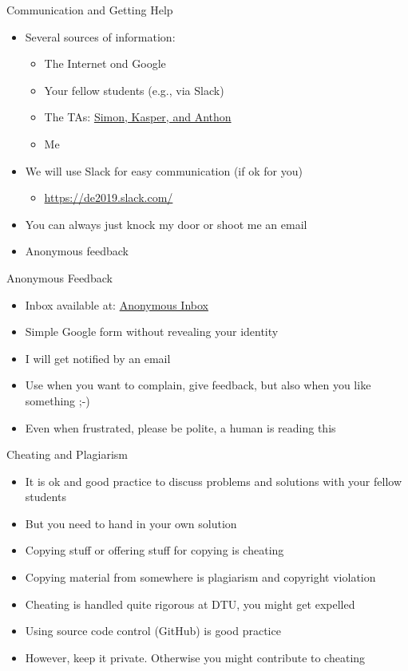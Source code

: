 \documentclass[xcolor=pdflatex,dvipsnames,table]{beamer}
\begin{document}
\begin{frame}[fragile]{Communication and Getting Help}
\begin{itemize}
\item Several sources of information:
\begin{itemize}
\item The Internet ond Google
\item Your fellow students (e.g., via Slack)
\item The TAs: \href{https://cn.inside.dtu.dk/cnnet/element/612883/participants}{Simon, Kasper, and Anthon}
\item Me
\end{itemize}
\item We will use Slack for easy communication (if ok for you)
\begin{itemize}
\item \url{https://de2019.slack.com/}
\end{itemize}
\item You can always just knock my door or shoot me an email
\item Anonymous feedback
\end{itemize}
\end{frame}

\begin{frame}[fragile]{Anonymous Feedback}
\begin{itemize}
\item Inbox available at: 
\href{https://docs.google.com/forms/d/e/1FAIpQLSclKyEM_foF7U0TF-CoIZhla5EFEcE8-EGD7Jvle6TBB90WZw/viewform?vc=0&c=0&w=1&usp=mail_form_link}{Anonymous Inbox}
\item Simple Google form without revealing your identity
\item I will get notified by an email
\item Use when you want to complain, give feedback, but also when you like something ;-)
\item Even when frustrated, please be polite, a human is reading this
\end{itemize}
\end{frame}

\begin{frame}[fragile]{Cheating and Plagiarism}
\begin{itemize}
\item It is ok and good practice to discuss problems and solutions with your fellow students
\item But you need to hand in your own solution
\item Copying stuff or offering stuff for copying is cheating
\item Copying material from somewhere is plagiarism and copyright violation
\item Cheating is handled quite rigorous at DTU, you might get expelled
\item Using source code control (GitHub) is good practice
\item However, keep it private. Otherwise you might contribute to cheating
\end{itemize}
\end{frame}
\end{document}
